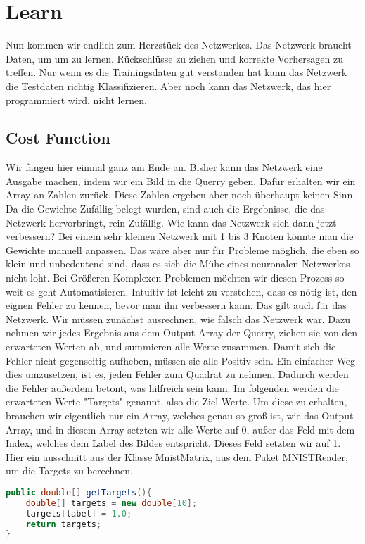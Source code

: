 \documentclass[12pt]{article}
\begin{document}
\section{ Learn}Nun kommen wir endlich zum Herzstück des Netzwerkes. Das Netzwerk braucht Daten, um um zu lernen. Rückschlüsse zu ziehen und korrekte Vorhersagen zu treffen. Nur wenn es die Trainingsdaten gut verstanden hat kann das Netzwerk die Testdaten richtig Klassifizieren. Aber noch kann das Netzwerk, das hier programmiert wird, nicht lernen.
\subsection{ Cost Function}Wir fangen hier einmal ganz am Ende an. Bisher kann das Netzwerk eine Ausgabe machen, indem wir ein Bild in die Querry geben. Dafür erhalten wir ein Array an Zahlen zurück. Diese Zahlen ergeben aber noch überhaupt keinen Sinn. Da die Gewichte Zufällig belegt wurden, sind auch die Ergebnisse, die das Netzwerk hervorbringt, rein Zufällig. 
Wie kann das Netzwerk sich dann jetzt verbessern? Bei einem sehr kleinen Netzwerk mit 1 bis 3 Knoten könnte man die Gewichte manuell anpassen. Das wäre aber nur für Probleme möglich, die eben so klein und unbedeutend sind, dass es sich die Mühe eines neuronalen Netzwerkes nicht loht. Bei Größeren Komplexen Problemen möchten wir diesen Prozess so weit es geht Automatisieren.
Intuitiv ist leicht zu verstehen, dass es nötig ist, den eignen Fehler zu kennen, bevor man ihn verbessern kann. Das gilt auch für das Netzwerk. Wir müssen zunächst ausrechnen, wie falsch das Netzwerk war. Dazu nehmen wir jedes Ergebnis aus dem Output Array der Querry, ziehen sie von den erwarteten Werten ab, und summieren alle Werte zusammen. Damit sich die Fehler nicht gegenseitig aufheben, müssen sie alle Positiv sein. Ein einfacher Weg dies umzusetzen, ist es, jeden Fehler zum Quadrat zu nehmen. Dadurch werden die Fehler außerdem betont, was hilfreich sein kann. Im folgenden werden die erwarteten Werte "Targets" genannt, also die Ziel-Werte. Um diese zu erhalten, brauchen wir eigentlich nur ein Array, welches genau so groß ist, wie das Output Array, und in diesem Array setzten wir alle Werte auf 0, außer das Feld mit dem Index, welches dem Label des Bildes entspricht. Dieses Feld setzten wir auf 1. Hier ein ausschnitt aus der Klasse MnistMatrix, aus dem Paket MNISTReader, um die Targets zu berechnen.
\begin{lstlisting}[language=Java]
public double[] getTargets(){
    double[] targets = new double[10];
    targets[label] = 1.0;
    return targets;
} 
\end{lstlisting}
\end{document}

